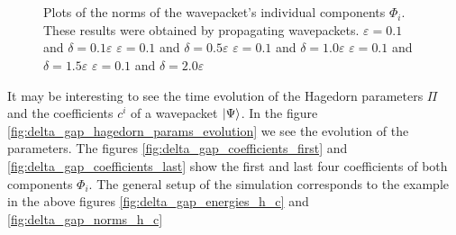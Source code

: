 \begin{figure}
{  } \\
   \\

  \caption[Plots of the norms of the wavepacket's individual components $\Phi_i$]{
    Plots of the norms of the wavepacket's individual components $\Phi_i$. These
    results were obtained by propagating wavepackets.
     $\varepsilon = 0.1$ and $\delta = 0.1 \varepsilon$
     $\varepsilon = 0.1$ and $\delta = 0.5 \varepsilon$
     $\varepsilon = 0.1$ and $\delta = 1.0 \varepsilon$
     $\varepsilon = 0.1$ and $\delta = 1.5 \varepsilon$
     $\varepsilon = 0.1$ and $\delta = 2.0 \varepsilon$
    \label{fig:delta_gap_norms_h}
  }
\end{figure}

It may be interesting to see the time evolution of the Hagedorn parameters $\Pi$
and the coefficients $c^i$ of a wavepacket $\Ket{\Psi}$. In the figure \ref{fig:delta_gap_hagedorn_params_evolution}
we see the evolution of the parameters. The figures \ref{fig:delta_gap_coefficients_first}
and \ref{fig:delta_gap_coefficients_last}
show the first and last four coefficients of both components $\Phi_i$. The general
setup of the simulation corresponds to the example in the above figures \ref{fig:delta_gap_energies_h_c}
and \ref{fig:delta_gap_norms_h_c}


